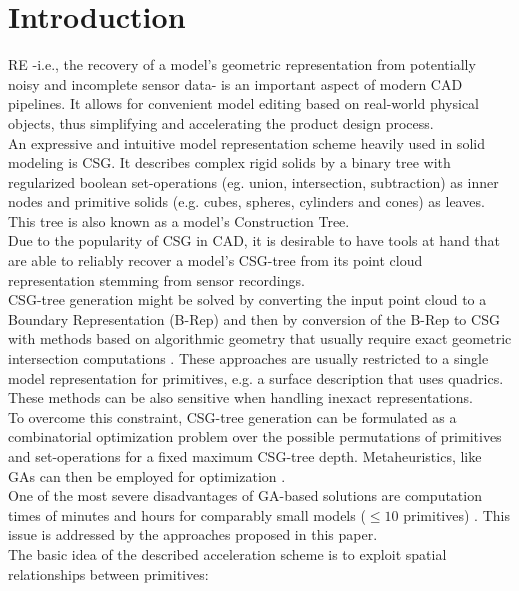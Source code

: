 \section{Introduction}
\ac{RE} -i.e., the recovery of a model's geometric representation from potentially noisy and incomplete sensor data- is an important aspect of modern \ac{CAD} pipelines. 
It allows for convenient model editing based on real-world physical objects, thus simplifying and accelerating the product design process.
\\
An expressive and intuitive model representation scheme heavily used in solid modeling is \ac{CSG}.
It describes complex rigid solids by a binary tree with regularized boolean set-operations (eg. union, intersection, subtraction) as inner nodes and primitive solids (e.g. cubes, spheres, cylinders and cones) as leaves. 
This tree is also known as a model's Construction Tree.
\\
Due to the popularity of \ac{CSG} in \ac{CAD}, it is desirable to have tools at hand that are able to reliably recover a model's \ac{CSG}-tree from its point cloud representation stemming from sensor recordings.
\\
\ac{CSG}-tree generation might be solved by converting the input point cloud to a Boundary Representation (B-Rep) and then by conversion of the B-Rep to CSG with methods based on algorithmic geometry that usually require exact geometric intersection computations \cite{shapiro1993separation, buchele2004three}. 
These approaches are usually restricted to a single model representation for primitives, e.g. a surface description that uses quadrics. 
These methods can be also sensitive when handling inexact representations. 
\\
To overcome this constraint, \ac{CSG}-tree generation can be formulated as a combinatorial optimization problem over the possible permutations of primitives and set-operations for a fixed maximum \ac{CSG}-tree depth.
Metaheuristics, like \acp{GA} can then be employed for optimization \cite{mitchell1998introduction}.
\\
One of the most severe disadvantages of \ac{GA}-based solutions are computation times of minutes and hours for comparably small models ($\le 10$ primitives) \cite{fayolle2016evolutionary}.
This issue is addressed by the approaches proposed in this paper.  
\\
The basic idea of the described acceleration scheme is to exploit spatial relationships between primitives: 
